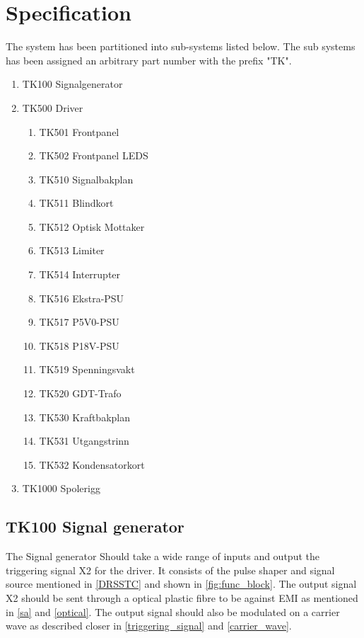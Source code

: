 \section{Specification}
The system has been partitioned into sub-systems listed below. The sub systems has been assigned an arbitrary part number with the prefix "TK".


\begin{enumerate}
    \item TK100 Signalgenerator
    \item TK500 Driver
    \begin{enumerate}
        \item TK501 Frontpanel
        \item TK502 Frontpanel LEDS
        \item TK510 Signalbakplan
        \item TK511 Blindkort
        \item TK512 Optisk Mottaker
        \item TK513 Limiter
        \item TK514 Interrupter
        \item TK516 Ekstra-PSU
        \item TK517 P5V0-PSU
        \item TK518 P18V-PSU
        \item TK519 Spenningsvakt
        \item TK520 GDT-Trafo
        \item TK530 Kraftbakplan
        \item TK531 Utgangstrinn
        \item TK532 Kondensatorkort
    \end{enumerate}
    \item TK1000 Spolerigg
\end{enumerate}

\subsection{TK100 Signal generator}
The Signal generator Should take a wide range of inputs and output the triggering signal X2 for the driver. It consists of the pulse shaper and signal source mentioned in \cref{DRSSTC} and shown in \cref{fig:func_block}. The output signal X2 should be sent through a optical plastic fibre to be against EMI as mentioned in \cref{sa} and \cref{optical}. The output signal should also be modulated on a carrier wave as described closer in \cref{triggering_signal} and \cref{carrier_wave}.

